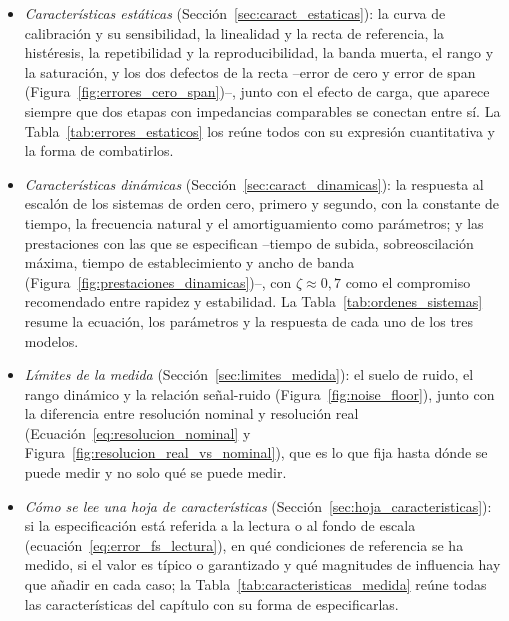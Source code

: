 \begin{itemize}
    \item \emph{Características estáticas} (Sección~\ref{sec:caract_estaticas}): la curva de calibración y su sensibilidad, la linealidad y la recta de referencia, la histéresis, la repetibilidad y la reproducibilidad, la banda muerta, el rango y la saturación, y los dos defectos de la recta --error de cero y error de span (Figura~\ref{fig:errores_cero_span})--, junto con el efecto de carga, que aparece siempre que dos etapas con impedancias comparables se conectan entre sí. La Tabla~\ref{tab:errores_estaticos} los reúne todos con su expresión cuantitativa y la forma de combatirlos.
    \item \emph{Características dinámicas} (Sección~\ref{sec:caract_dinamicas}): la respuesta al escalón de los sistemas de orden cero, primero y segundo, con la constante de tiempo, la frecuencia natural y el amortiguamiento como parámetros; y las prestaciones con las que se especifican --tiempo de subida, sobreoscilación máxima, tiempo de establecimiento y ancho de banda (Figura~\ref{fig:prestaciones_dinamicas})--, con $\zeta \approx 0{,}7$ como el compromiso recomendado entre rapidez y estabilidad. La Tabla~\ref{tab:ordenes_sistemas} resume la ecuación, los parámetros y la respuesta de cada uno de los tres modelos.
    \item \emph{Límites de la medida} (Sección~\ref{sec:limites_medida}): el suelo de ruido, el rango dinámico y la relación señal-ruido (Figura~\ref{fig:noise_floor}), junto con la diferencia entre resolución nominal y resolución real (Ecuación~\eqref{eq:resolucion_nominal} y Figura~\ref{fig:resolucion_real_vs_nominal}), que es lo que fija hasta dónde se puede medir y no solo qué se puede medir.
    \item \emph{Cómo se lee una hoja de características} (Sección~\ref{sec:hoja_caracteristicas}): si la especificación está referida a la lectura o al fondo de escala (ecuación~\eqref{eq:error_fs_lectura}), en qué condiciones de referencia se ha medido, si el valor es típico o garantizado y qué magnitudes de influencia hay que añadir en cada caso; la Tabla~\ref{tab:caracteristicas_medida} reúne todas las características del capítulo con su forma de especificarlas.
\end{itemize}

